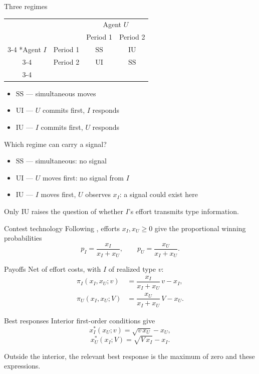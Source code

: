 \documentclass[10pt]{beamer}
\let\focusoldcitet\citet
\renewcommand{\citet}[1]{\textcolor{alert}{\focusoldcitet{#1}}}%
\newcommand{\rSS}{\mathrm{SS}}
\newcommand{\rUI}{\mathrm{UI}}
\newcommand{\rIU}{\mathrm{IU}}
\newcommand{\timinggametable}[4]{%
  \begin{table}[H]
    \setlength{\extrarowheight}{3pt}
    \centering
    \begin{tabular}{cc|c|c|}
      & \multicolumn{1}{c}{} & \multicolumn{2}{c}{Agent $U$}\\
      & \multicolumn{1}{c}{} & \multicolumn{1}{c}{Period 1} & \multicolumn{1}{c}{Period 2} \\\cline{3-4}
      \multirow{2}*{Agent $I$} & Period 1 & #1 & #2 \\\cline{3-4}
      & Period 2 & #3 & #4 \\\cline{3-4}
    \end{tabular}
  \end{table}%
}
\begin{document}
\begin{frame}{Three regimes}
  \timinggametable{$\rSS$}{$\rIU$}{$\rUI$}{$\rSS$}

  \vspace{0.5em}
  \begin{itemize}
    \item $\rSS$ --- simultaneous moves
    \item $\rUI$ --- $U$ commits first, $I$ responds
    \item $\rIU$ --- $I$ commits first, $U$ responds
  \end{itemize}
\end{frame}

\begin{frame}{Which regime can carry a signal?}
  \begin{itemize}
    \item $\rSS$ --- simultaneous: no signal
    \item $\rUI$ --- $U$ moves first: no signal from $I$
    \item $\rIU$ --- $I$ moves first, $U$ observes $x_I$:
          \alert{a signal could exist here}
  \end{itemize}

  \vspace{0.5em}
  Only $\rIU$ raises the question of whether $I$'s effort transmits type
  information.
\end{frame}

\begin{frame}{Contest technology}
  Following \citet{tullock1980}, efforts $x_I, x_U \ge 0$ give the
  proportional winning probabilities
  \begin{equation}
    p_I = \dfrac{x_I}{x_I + x_U}, \qquad
    p_U = \dfrac{x_U}{x_I + x_U}.
  \end{equation}
\end{frame}

\begin{frame}{Payoffs}
  Net of effort costs, with $I$ of realized type $v$:
  \begin{align*}
    \pi_I(x_I, x_U; v) &= \dfrac{x_I}{x_I + x_U}\, v - x_I,\\[4pt]
    \pi_U(x_I, x_U; V) &= \dfrac{x_U}{x_I + x_U}\, V - x_U.
  \end{align*}
\end{frame}

\begin{frame}{Best responses}
  Interior first-order conditions give
  \begin{equation}
    x_I^{*}(x_U; v) = \sqrt{v\,x_U} - x_U,
  \end{equation}
  \begin{equation}
    x_U^{*}(x_I; V) = \sqrt{V\,x_I} - x_I.
  \end{equation}

  Outside the interior, the relevant best response is the maximum of
  zero and these expressions.
\end{frame}
\end{document}
